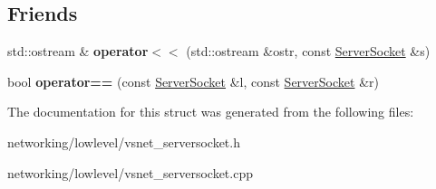 \subsection*{Friends}
\begin{DoxyCompactItemize}
\item 
std\+::ostream \& {\bfseries operator$<$$<$} (std\+::ostream \&ostr, const \hyperlink{structServerSocket}{Server\+Socket} \&s)\hypertarget{structServerSocket_a82b780a676c74f3eda5911bc55c3e8b9}{}\label{structServerSocket_a82b780a676c74f3eda5911bc55c3e8b9}

\item 
bool {\bfseries operator==} (const \hyperlink{structServerSocket}{Server\+Socket} \&l, const \hyperlink{structServerSocket}{Server\+Socket} \&r)\hypertarget{structServerSocket_a63b49a6e4337ef9bf0bda5adf018b0c9}{}\label{structServerSocket_a63b49a6e4337ef9bf0bda5adf018b0c9}

\end{DoxyCompactItemize}


The documentation for this struct was generated from the following files\+:\begin{DoxyCompactItemize}
\item 
networking/lowlevel/vsnet\+\_\+serversocket.\+h\item 
networking/lowlevel/vsnet\+\_\+serversocket.\+cpp\end{DoxyCompactItemize}

